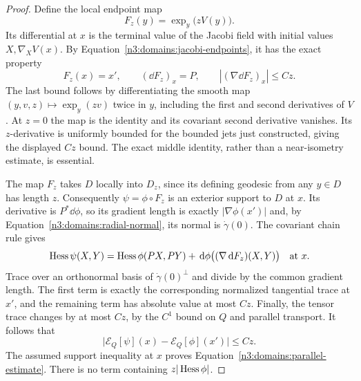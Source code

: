 \begin{proof}
Define the local endpoint map
\[
 F_z(y)=\exp_y\bigl(zV(y)\bigr).
\]
Its differential at $x$ is the terminal value of the Jacobi field
with initial values $X,\nabla_XV(x)$.  By
Equation~\eqref{n3:domains:jacobi-endpoints}, it has the exact property
\begin{equation}\label{n3:domains:exact-endpoint-isometry}
 F_z(x)=x',\qquad (\dd F_z)_x=P,
 \qquad |(\nabla\dd F_z)_x|\leq Cz.
\end{equation}
The last bound follows by differentiating the
smooth map $(y,v,z)\mapsto\exp_y(zv)$ twice in $y$, including the
first and second derivatives of $V$.  At $z=0$ the map is the
identity and its covariant second derivative vanishes.  Its
$z$-derivative is uniformly bounded for the bounded jets just
constructed, giving the displayed $Cz$ bound.  The exact middle
identity, rather than a near-isometry estimate, is essential.

The map $F_z$ takes $D$ locally into $D_z$, since its defining
geodesic from any $y\in D$ has length $z$.  Consequently
$\psi=\phi\circ F_z$ is an exterior support to $D$ at $x$.
Its derivative is $P^*\dd\phi$, so its gradient length is exactly
$|\nabla\phi(x')|$ and, by
Equation~\eqref{n3:domains:radial-normal}, its normal is
$\dot\gamma(0)$.  The covariant chain rule gives
\[
 \operatorname{Hess}\psi(X,Y)
   =\operatorname{Hess}\phi(PX,PY)
        +\,\mathrm d\phi\bigl((\nabla\,\mathrm d F_z)(X,Y)\bigr)
 \quad\hbox{at }x.
\]
Trace over an orthonormal basis of $\dot\gamma(0)^\perp$ and divide
by the common gradient length.  The first term is exactly the
corresponding normalized tangential trace at $x'$, and the remaining
term has absolute value at most $Cz$.  Finally, the tensor trace
changes by at most $Cz$, by the $C^1$ bound on $Q$ and parallel
transport.  It follows that
\[
 \bigl|\mathcal E_Q[\psi](x)
             -\mathcal E_Q[\phi](x')\bigr|\leq Cz.
\]
The assumed support inequality at $x$ proves
Equation~\eqref{n3:domains:parallel-estimate}.  There is no term
containing $z|\operatorname{Hess}\phi|$.
\end{proof}

